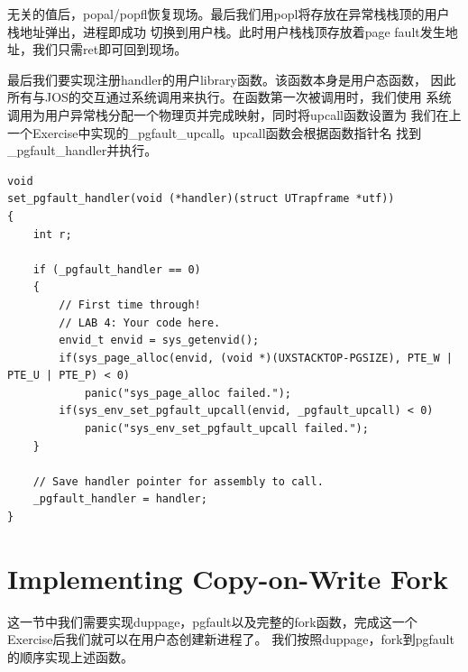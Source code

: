 \documentclass[12pt, letterpaper]{report}
\begin{document}
无关的值后，popal/popfl恢复现场。最后我们用popl将存放在异常栈栈顶的用户栈地址弹出，进程即成功
切换到用户栈。此时用户栈栈顶存放着page fault发生地址，我们只需ret即可回到现场。\par
\quad \par 
{}
最后我们要实现注册handler的用户library函数。该函数本身是用户态函数，
因此所有与JOS的交互通过系统调用来执行。在函数第一次被调用时，我们使用
系统调用为用户异常栈分配一个物理页并完成映射，同时将upcall函数设置为
我们在上一个Exercise中实现的\_pgfault\_upcall。upcall函数会根据函数指针名
找到\_pgfault\_handler并执行。\par 
\lstset{style=CStyle}
\setmainfont{Consolas}
\begin{lstlisting}
void
set_pgfault_handler(void (*handler)(struct UTrapframe *utf))
{
    int r;

    if (_pgfault_handler == 0) 
    {
        // First time through!
        // LAB 4: Your code here.
        envid_t envid = sys_getenvid();
        if(sys_page_alloc(envid, (void *)(UXSTACKTOP-PGSIZE), PTE_W | PTE_U | PTE_P) < 0)
            panic("sys_page_alloc failed.");
        if(sys_env_set_pgfault_upcall(envid, _pgfault_upcall) < 0)
            panic("sys_env_set_pgfault_upcall failed.");
    }

    // Save handler pointer for assembly to call.
    _pgfault_handler = handler;
}
\end{lstlisting}
\setmainfont{Times New Roman}

\newpage
\section[\large Implementing Copy-on-Write Fork]{Implementing Copy-on-Write Fork}
这一节中我们需要实现duppage，pgfault以及完整的fork函数，完成这一个Exercise后我们就可以在用户态创建新进程了。
我们按照duppage，fork到pgfault的顺序实现上述函数。\par 
\end{document}
